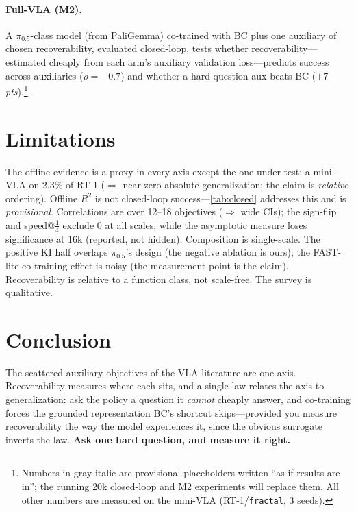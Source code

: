 \documentclass{article}
\newcommand{\prov}[1]{\textcolor{gray!85}{\textit{#1}}} %
\begin{document}
\paragraph{Full-VLA (M2).} A $\pi_{0.5}$-class model (from PaliGemma) co-trained with BC plus one auxiliary of
chosen recoverability, evaluated closed-loop, tests whether recoverability---estimated cheaply from each arm's
auxiliary validation loss---predicts success across auxiliaries (\prov{$\rho=-0.7$}) and whether a hard-question
aux beats BC (\prov{$+7$ pts}).\footnote{Numbers in gray italic are provisional placeholders written ``as if
results are in''; the running 20k closed-loop and M2 experiments will replace them. All other numbers are measured
on the mini-VLA (RT-1/\texttt{fractal}, 3 seeds).}

\section{Limitations}\label{sec:limits}
The offline evidence is a proxy in every axis except the one under test: a mini-VLA on 2.3\% of RT-1
($\Rightarrow$ near-zero absolute generalization; the claim is \emph{relative} ordering). Offline $R^2$ is not
closed-loop success---\cref{tab:closed} addresses this and is \prov{provisional}. Correlations are over 12--18
objectives ($\Rightarrow$ wide CIs); the sign-flip and speed@$\tfrac14$ exclude 0 at all scales, while the
asymptotic measure loses significance at 16k (reported, not hidden). Composition is single-scale. The positive KI
half overlaps $\pi_{0.5}$'s design (the negative ablation is ours); the FAST-lite co-training effect is noisy (the
measurement point is the claim). Recoverability is relative to a function class, not scale-free. The survey is
qualitative.

\section{Conclusion}\label{sec:conclusion}
The scattered auxiliary objectives of the VLA literature are one axis. Recoverability measures where each sits, and
a single law relates the axis to generalization: ask the policy a question it \emph{cannot} cheaply answer, and
co-training forces the grounded representation BC's shortcut skips---provided you measure recoverability the way the
model experiences it, since the obvious surrogate inverts the law. \textbf{Ask one hard question, and measure it
right.}



\end{document}
